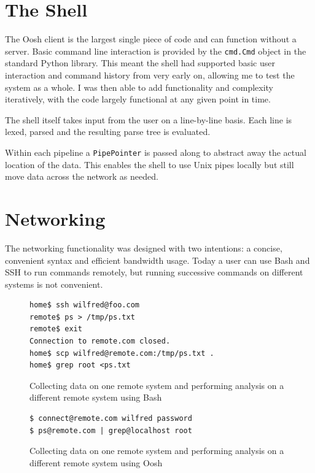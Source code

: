 \documentclass[12pt,twoside,notitlepage]{report}
\begin{document}
\section{The Shell}
The Oosh client is the largest single piece of code and can function without a
server. Basic command line interaction is provided by the {\tt cmd.Cmd} object
in the standard Python library. This meant the shell had supported basic user
interaction and command history from very early on, allowing me to test the
system as a whole. I was then able to add functionality and complexity
iteratively, with the code largely functional at any given point in time.

The shell itself takes input from the user on a line-by-line basis. Each line is
lexed, parsed and the resulting parse tree is evaluated.

Within each pipeline %
a {\tt PipePointer} is passed along to abstract away the actual location of the
data. This enables the shell to use Unix pipes locally %
but still move data across the network as needed.

\section{Networking}
\label{networking}

The networking functionality was designed with two intentions: a concise,
convenient syntax and efficient bandwidth usage. Today a user can use Bash and
SSH to run commands remotely, but running successive commands on different
systems is not convenient.


\begin{figure}[h]
\begin{verbatim}
home$ ssh wilfred@foo.com
remote$ ps > /tmp/ps.txt
remote$ exit
Connection to remote.com closed.
home$ scp wilfred@remote.com:/tmp/ps.txt .
home$ grep root <ps.txt 
\end{verbatim}
\caption{Collecting data on one remote system and performing analysis
  on a different remote system using Bash}
\label{sshremote}
\end{figure}

\begin{figure}[h]
\begin{verbatim}
$ connect@remote.com wilfred password
$ ps@remote.com | grep@localhost root
\end{verbatim}
\caption{Collecting data on one remote system and performing analysis
  on a different remote system using Oosh}
\end{figure}
\end{document}
